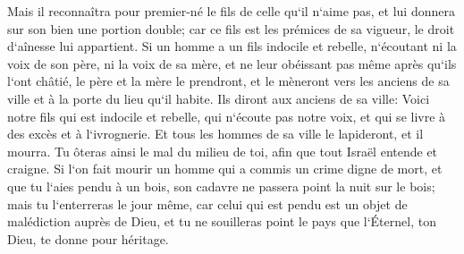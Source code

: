 \verse Mais il reconnaîtra pour premier-né le fils de celle qu`il n`aime pas, et lui donnera sur son bien une portion double; car ce fils est les prémices de sa vigueur, le droit d`aînesse lui appartient. 
\verse Si un homme a un fils indocile et rebelle, n`écoutant ni la voix de son père, ni la voix de sa mère, et ne leur obéissant pas même après qu`ils l`ont châtié, 
\verse le père et la mère le prendront, et le mèneront vers les anciens de sa ville et à la porte du lieu qu`il habite. 
\verse Ils diront aux anciens de sa ville: Voici notre fils qui est indocile et rebelle, qui n`écoute pas notre voix, et qui se livre à des excès et à l`ivrognerie. 
\verse Et tous les hommes de sa ville le lapideront, et il mourra. Tu ôteras ainsi le mal du milieu de toi, afin que tout Israël entende et craigne. 
\verse Si l`on fait mourir un homme qui a commis un crime digne de mort, et que tu l`aies pendu à un bois, 
\verse son cadavre ne passera point la nuit sur le bois; mais tu l`enterreras le jour même, car celui qui est pendu est un objet de malédiction auprès de Dieu, et tu ne souilleras point le pays que l`Éternel, ton Dieu, te donne pour héritage. 

\chapter{}

